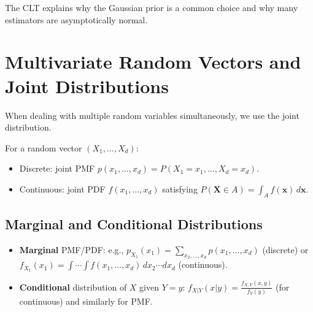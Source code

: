 \documentclass{tufte-handout}
\begin{document}
\begin{marginfigure}
\centering
{}
\caption{The CLT: as $n$ increases, the distribution of $\overline{X}_n$ becomes narrower and more Gaussian.}
\end{marginfigure}

The CLT explains why the Gaussian prior is a common choice and why many estimators are asymptotically normal.

\section{Multivariate Random Vectors and Joint Distributions}

When dealing with multiple random variables simultaneously, we use the joint distribution.

\begin{defn}
    For a random vector $(X_1,\dots,X_d)$:
    \begin{itemize}
        \item Discrete: joint PMF $p(x_1,\dots,x_d) = P(X_1=x_1,\dots,X_d=x_d)$.
        \item Continuous: joint PDF $f(x_1,\dots,x_d)$ satisfying $P(\mathbf{X} \in A) = \int_A f(\mathbf{x})\,d\mathbf{x}$.
    \end{itemize}
\end{defn}

\subsection{Marginal and Conditional Distributions}
\begin{itemize}
    \item \textbf{Marginal} PMF/PDF: e.g., $p_{X_1}(x_1) = \sum_{x_2,\dots,x_d} p(x_1,\dots,x_d)$ (discrete) or $f_{X_1}(x_1) = \int \cdots \int f(x_1,\dots,x_d)\,dx_2\cdots dx_d$ (continuous).
    \item \textbf{Conditional} distribution of $X$ given $Y=y$: $f_{X|Y}(x|y) = \frac{f_{X,Y}(x,y)}{f_Y(y)}$ (for continuous) and similarly for PMF.
\end{itemize}
\end{document}

